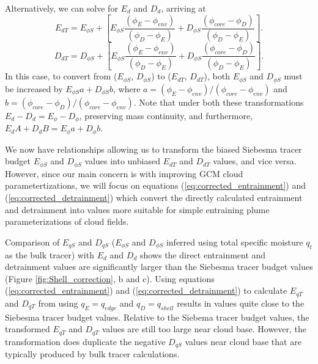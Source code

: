 \documentclass[12pt]{article}
\begin{document}
Alternatively, we can solve for $E_d$ and $D_d$, arriving at
\begin{equation}
  \label{eq:corrected_entrainment2}
    E_{d T} = E_{\phi S} 
        + \left[E_{\phi S}\frac{(\phi_E - \phi_{env})}{(\phi_D - \phi_E)} 
              + D_{\phi S}\frac{(\phi_{core} - \phi_D)}{(\phi_D - \phi_E)}\right].
\end{equation}
\begin{equation}
  \label{eq:corrected_detrainment2}
    D_{d T} = D_{\phi S} 
        + \left[E_{\phi S}\frac{(\phi_E - \phi_{env})}{(\phi_D - \phi_E)}
              + D_{\phi S}\frac{(\phi_{core} - \phi_D)}{(\phi_D - \phi_E)}\right].
\end{equation}
In this case, to convert from ($E_{\phi S}$, $D_{\phi S}$) to 
($E_{dT}$, $D_{dT}$), both $E_{\phi S}$ and $D_{\phi S}$ must be increased by 
$E_{\phi S} a + D_{\phi S} b$, where 
$a = (\phi_E - \phi_{env})/(\phi_{core} - \phi_{env})$ and 
$b = (\phi_{core} - \phi_D)/(\phi_{core} - \phi_{env})$.  Note that under both these transformations $E_d-D_d = E_{\phi}-D_{\phi}$, preserving mass continuity,
and furthermore, $E_d A + D_d B = E_{\phi} a + D_{\phi} b$.

We now have relationships allowing us to transform the biased Siebesma tracer
budget $E_{\phi S}$ and $D_{\phi S}$  values into unbiased $E_{dT}$ and $D_{dT}$
values, and vice versa.  However, since our main concern is with improving GCM
cloud parametertizations, we will focus on equations 
(\ref{eq:corrected_entrainment}) and (\ref{eq:corrected_detrainment}) which 
convert the directly calculated entrainment and detrainment into values 
more suitable for simple entraining plume parameterizations of cloud fields.

Comparison of $E_{q S}$ and $D_{q S}$ ($E_{\phi S}$ and $D_{\phi S}$ inferred
using total specific moisture $q_t$ as the bulk tracer) with $E_d$ and $D_d$
shows the direct entrainment and detrainment values are significantly larger 
than the Siebesma tracer budget values (Figure \ref{fig:Shell_correction}, 
b and c).  Using equations (\ref{eq:corrected_entrainment}) and 
(\ref{eq:corrected_detrainment}) to calculate $E_{q T}$ and $D_{q T}$ from 
using $q_E = q_{edge}$ and $q_D = q_{shell}$ results in values quite close to 
the Siebesma tracer budget values.  Relative to the Siebema tracer budget
values, the transformed $E_{q T}$ and $D_{q T}$ values are still too large 
near cloud base.  However, the transformation does duplicate the negative 
$D_{q S}$ values near cloud base that are typically produced by bulk tracer calculations.
\end{document}
